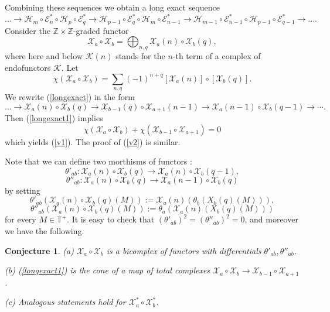 \documentclass[11pt]{amsart}
\newcounter{theorem}
\newtheorem{conjecture}[theo]{Conjecture}
\newcommand{\TT}{\mathbb{T}}
\begin{document}
Combining these sequences we obtain a long exact sequence
\begin{equation}\label{longexact}
\dots\rightarrow \mathcal H_{m}\circ \mathcal E^*_{n}\circ \mathcal
H_{p}\circ \mathcal E^*_{q} 
\rightarrow  \mathcal H_{p-1}\circ \mathcal E^*_{q}\circ \mathcal
H_{m}\circ \mathcal E^*_{n-1}\rightarrow  \mathcal H_{m-1}\circ
\mathcal E^*_{n-1}\circ \mathcal H_{p-1}\circ \mathcal E^*_{q-1}\rightarrow\dots.
\end{equation}
 Consider the $\mathbb Z\times\mathbb Z$-graded functor
\begin{equation}\label{bicomplexfunctor}
\mathcal X_a\circ\mathcal X_b=\bigoplus_{n,q} \mathcal X_a(n)\circ\mathcal X_b(q),\nonumber
\end{equation}
where here and below $\mathcal K(n)$ stands for the $n$-th term of a complex of endofunctors $\mathcal K$.
Let
$$\chi(\mathcal X_a\circ\mathcal X_b)=\sum_{n,q}(-1)^{n+q} [\mathcal X_a(n)]\circ[\mathcal X_b(q)].$$
We rewrite  (\ref{longexact}) in the form
\begin{equation}\label{longexact1}
\dots\to \mathcal X_a(n)\circ\mathcal X_b(q)\to  \mathcal X_{b-1}(q)\circ\mathcal X_{a+1}(n-1)\to  \mathcal X_a(n-1)\circ\mathcal X_b(q-1)\to\cdots.
\end{equation}
Then (\ref{longexact1}) implies 
$$\chi(\mathcal X_a\circ\mathcal X_b)+\chi(\mathcal X_{b-1}\circ\mathcal X_{a+1})=0$$ 
which yields (\ref{v1}). The proof of  (\ref{v2}) is similar.

Note that we can define two morthisms of functors : 
$$\theta'_{ab}:\mathcal X_a(n)\circ\mathcal X_b(q)\to \mathcal X_a(n)\circ\mathcal X_b(q-1),$$
$$\theta''_{ab}:\mathcal X_a(n)\circ\mathcal X_b(q)\to \mathcal X_a(n-1)\circ\mathcal X_b(q)$$
by setting 
$$\theta'_{ab}\left(\mathcal X_a(n)\circ\mathcal X_b(q)(M)\right):=\mathcal X_a(n)(\theta_b( X_b(q)(M))),$$
$$\theta''_{ab}\left(\mathcal X_a(n)\circ\mathcal X_b(q)(M)\right):=\theta_a(\mathcal X_a(n)( X_b(q)(M)))$$
for every $M\in\TT^+$. It is easy to check that $(\theta'_{ab})^2=(\theta''_{ab})^2=0$, and moreover
we have the following.
\begin{conjecture}\label{comrel}
(a) $\mathcal X_a\circ\mathcal X_b$ is a bicomplex of functors with differentials  $\theta'_{ab},\theta''_{ab}$.

(b) (\ref{longexact1}) is the cone of a map of total complexes $\mathcal X_a\circ\mathcal X_b\to  \mathcal X_{b-1}\circ\mathcal X_{a+1}$ .

(c) Analogous statements hold for $\mathcal X_a^*\circ\mathcal X_b^*$.
\end{conjecture}
\end{document}
